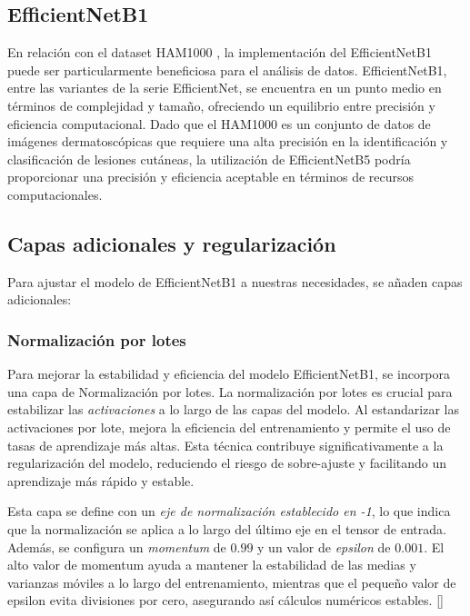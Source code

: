 \subsection{EfficientNetB1}

En relación con el dataset HAM1000 , la implementación del EfficientNetB1 puede ser particularmente beneficiosa para el análisis de datos. EfficientNetB1, entre las variantes de la serie EfficientNet, se encuentra en un punto medio en términos de complejidad y tamaño, ofreciendo un equilibrio entre precisión y eficiencia computacional. Dado que el HAM1000 es un conjunto de datos de imágenes dermatoscópicas que requiere una alta precisión en la identificación y clasificación de lesiones cutáneas, la utilización de EfficientNetB5 podría proporcionar una precisión y eficiencia aceptable en términos de recursos computacionales.

\subsection{Capas adicionales y regularización}

Para ajustar el modelo de EfficientNetB1 a nuestras necesidades, se añaden capas adicionales:

\subsubsection{Normalización por lotes}

Para mejorar la estabilidad y eficiencia del modelo EfficientNetB1, se incorpora una capa de Normalización por lotes. La normalización por lotes es crucial para estabilizar las \textit{activaciones} a lo largo de las capas del modelo. Al estandarizar las activaciones por lote, mejora la eficiencia del entrenamiento y permite el uso de tasas de aprendizaje más altas. Esta técnica contribuye significativamente a la regularización del modelo, reduciendo el riesgo de sobre-ajuste y facilitando un aprendizaje más rápido y estable.

Esta capa se define con un \textit{eje de normalización establecido en -1}, lo que indica que la normalización se aplica a lo largo del último eje en el tensor de entrada. Además, se configura un \textit{momentum} de $0.99$ y un valor de \textit{epsilon} de $0.001$. El alto valor de momentum ayuda a mantener la estabilidad de las medias y varianzas móviles a lo largo del entrenamiento, mientras que el pequeño valor de epsilon evita divisiones por cero, asegurando así cálculos numéricos estables. []

